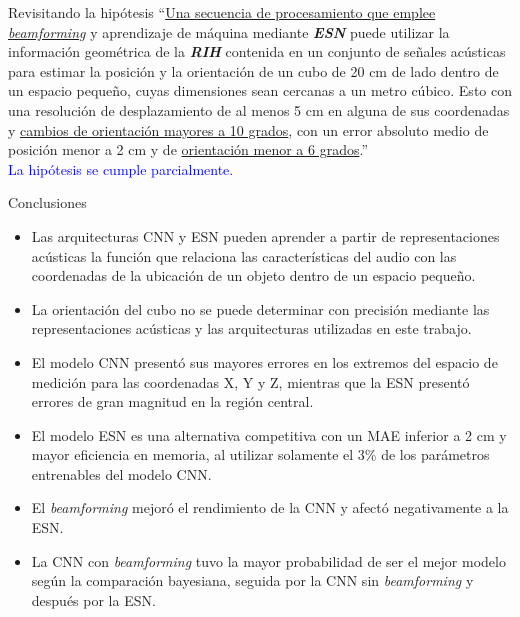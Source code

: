 \documentclass[aspectratio=169]{beamer}
\begin{document}
\begin{frame}{Revisitando la hipótesis}
\small
 ``\underline{Una secuencia de procesamiento que emplee \textit{beamforming}} y aprendizaje de máquina mediante \textit{\textbf{ESN}} puede utilizar la información geométrica de la \textit{\textbf{RIH}} contenida en un conjunto de señales acústicas para estimar la posición y la orientación de un cubo de 20 cm de lado dentro de un espacio pequeño, cuyas dimensiones sean cercanas a un metro cúbico. Esto con una resolución de desplazamiento de al menos 5 cm en alguna de sus coordenadas y \underline{cambios de orientación mayores a 10 grados}, con un error absoluto medio de posición menor a 2 cm y de \underline{orientación menor a 6 grados}.''\\
        \vspace*{0.5cm}
 \textcolor{blue}{La hipótesis se cumple parcialmente.}

\end{frame}




\begin{frame}{Conclusiones}
\footnotesize
\begin{itemize}
	\setlength{\itemsep}{0.5em}
	
	\item Las arquitecturas CNN y ESN pueden aprender a partir de representaciones acústicas la función que relaciona las características del audio con las coordenadas de la ubicación de un objeto dentro de un espacio pequeño.
	\item La orientación del cubo no se puede determinar con precisión mediante las representaciones acústicas y las arquitecturas utilizadas en este trabajo.
	\item El modelo CNN presentó sus mayores errores en los extremos del espacio de medición para las coordenadas X, Y y Z, mientras que la ESN presentó errores de gran magnitud en la región central.	
	\item El modelo ESN es una alternativa competitiva con un MAE inferior a 2 cm y mayor eficiencia en memoria, al utilizar solamente el 3\% de los parámetros entrenables del modelo CNN.
	\item El \textit{beamforming} mejoró el rendimiento de la CNN y afectó negativamente a la ESN.
	\item La CNN con \textit{beamforming} tuvo la mayor probabilidad de ser el mejor modelo según la comparación bayesiana, seguida por la CNN sin \textit{beamforming} y después por la ESN.


	
\end{itemize}

\end{frame}
\end{document}
